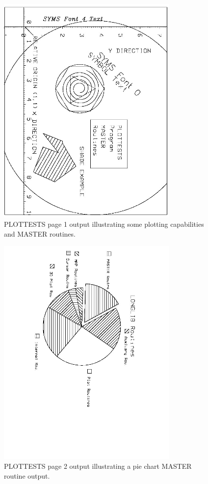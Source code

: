 \documentclass[11pt]{report}
\begin{document}
\begin{figure}[htb]
\centering
\includegraphics[width=3.5in,angle=90,origin=c]{figures/plottests0.jpg}
\vspace{-.5in}
\caption{PLOTTESTS page 1 output illustrating some plotting capabilities and MASTER routines.
\label{fig:plottests0}} 
\end{figure}

\begin{figure}[htb]
\centering
\includegraphics[width=3.5in,angle=90,origin=c]{figures/plottests1.jpg}
\vspace{-.5in}
\caption{PLOTTESTS page 2 output illustrating a pie chart MASTER routine output.
\label{fig:plottests1}} 
\end{figure}
\end{document}
